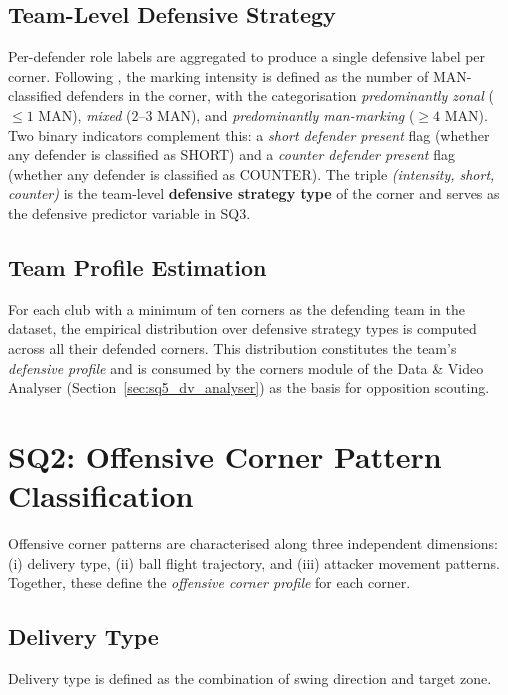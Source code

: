 \subsection{Team-Level Defensive Strategy}
\label{sec:sq1_team}

Per-defender role labels are aggregated to produce a single defensive label
per corner. Following \citet{FIFA2023}, the marking intensity is defined as the
number of MAN-classified defenders in the corner, with the categorisation
\textit{predominantly zonal} ($\leq 1$ MAN), \textit{mixed} ($2$--$3$ MAN), and
\textit{predominantly man-marking} ($\geq 4$ MAN). Two binary indicators
complement this: a \textit{short defender present} flag (whether any defender
is classified as SHORT) and a \textit{counter defender present} flag (whether
any defender is classified as COUNTER). The triple
\textit{(intensity, short, counter)} is the team-level \textbf{defensive strategy
type} of the corner and serves as the defensive predictor variable in SQ3.

\subsection{Team Profile Estimation}
\label{sec:sq1_team_profile}

For each club with a minimum of ten corners as the defending team in the
dataset, the empirical distribution over defensive strategy types is computed
across all their defended corners. This distribution constitutes the team's
\textit{defensive profile} and is consumed by the corners module of the Data
\& Video Analyser (Section~\ref{sec:sq5_dv_analyser}) as the basis for
opposition scouting.

\section{SQ2: Offensive Corner Pattern Classification}
\label{sec:sq2}

Offensive corner patterns are characterised along three independent dimensions:
(i) delivery type, (ii) ball flight trajectory, and (iii) attacker movement
patterns. Together, these define the \textit{offensive corner profile} for each
corner.

\subsection{Delivery Type}
\label{sec:sq2_delivery}

Delivery type is defined as the combination of swing direction and target zone.

